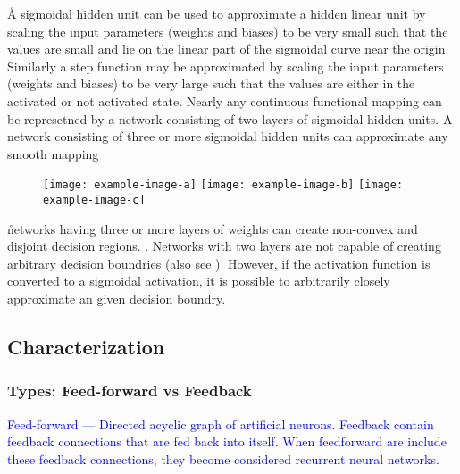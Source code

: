 \r{A sigmoidal hidden unit can be used to approximate a hidden linear unit by scaling the input parameters (weights and biases) to be very small such that the values are small and lie on the linear part of the sigmoidal curve near the origin. Similarly a step function may be approximated by scaling the input parameters (weights and biases) to be very large such that the values are either in the activated or not activated state. Nearly any continuous functional mapping can be represetned by a network consisting of two layers of sigmoidal hidden units.  A network consisting of three or more sigmoidal hidden units can approximate any smooth mapping }


\begin{figure}[htp]
	\centering
	\texttt{[image: example-image-a]}\hfil
	\texttt{[image: example-image-b]}\hfil
	\texttt{[image: example-image-c]}\hfil
	\caption{}
	\label{fig:foundations_ann_layers_decision_region}
\end{figure}

\r{networks having three or more layers of weights can create non-convex and disjoint decision regions. . Networks with two layers are not capable of creating arbitrary decision boundries  (also see ). However, if the activation function is converted to a sigmoidal activation, it is possible to arbitrarily closely approximate an given decision boundry.}

\subsection{Characterization}

\subsubsection{Types: Feed-forward vs Feedback}

\textcolor{blue}{Feed-forward --- Directed acyclic graph of artificial neurons. Feedback contain feedback connections that are fed back into itself. When feedforward are include these feedback connections, they become considered recurrent neural networks.}

